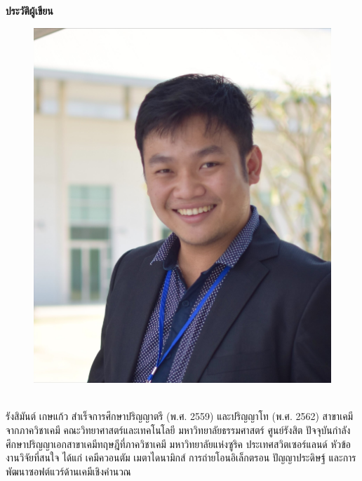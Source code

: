

{
\thispagestyle{empty}

\begin{center}
    \LARGE\textbf{ประวัติผู้เขียน}
\end{center}

\begin{minipage}[t][8cm][t]{\textwidth}
    \begin{figure}
        \includegraphics[width=0.85\linewidth]{fig/RK-profile.jpg}
    \end{figure}
    \leavevmode
    \\
    \hspace*{1em} รังสิมันต์ เกษแก้ว สำเร็จการศึกษาปริญญาตรี (พ.ศ. 2559) และปริญญาโท (พ.ศ. 2562) สาขาเคมี จากภาควิชาเคมี 
    คณะวิทยาศาสตร์และเทคโนโลยี มหาวิทยาลัยธรรมศาสตร์ ศูนย์รังสิต ปัจจุบันกำลังศึกษาปริญญาเอกสาขาเคมีทฤษฎีที่ภาควิชาเคมี 
    มหาวิทยาลัยแห่งซูริค ประเทศสวิตเซอร์แลนด์ หัวข้องานวิจัยที่สนใจ ได้แก่ เคมีควอนตัม เมตาไดนามิกส์ การถ่ายโอนอิเล็กตรอน ปัญญาประดิษฐ์ 
    และการพัฒนาซอฟต์แวร์ด้านเคมีเชิงคำนวณ
\end{minipage}

}
